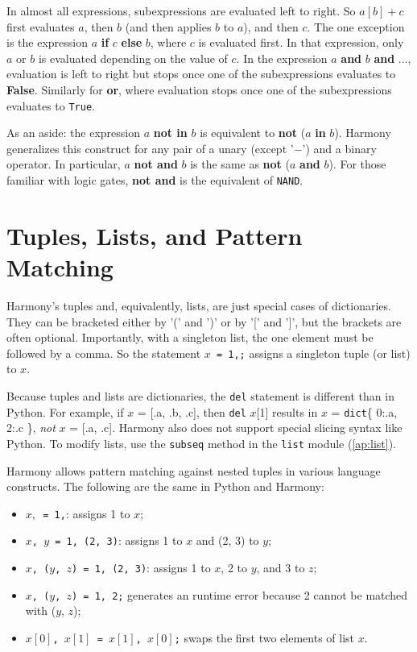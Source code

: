 \documentclass{report}
\begin{document}
In almost all expressions, subexpressions are evaluated left to right.  So $a[b] + c$
first evaluates $a$, then $b$ (and then applies $b$ to $a$), and then $c$.  The one
exception is the expression $a$ \textbf{if} $c$ \textbf{else} $b$, where $c$ is evaluated
first.  In that expression, only $a$ or $b$ is evaluated depending on the value of $c$.
In the expression $a$ \textbf{and} $b$ \textbf{and} $...$, evaluation is left
to right but stops once one of the subexpressions evaluates to \textbf{False}.
Similarly for \textbf{or}, where evaluation stops once one of the subexpressions
evaluates to \texttt{True}.

As an aside:
the expression $a$ \textbf{not in} $b$ is equivalent to \textbf{not} ($a$ \textbf{in} $b$).
Harmony generalizes this construct for any pair of a unary (except '$-$') and a binary operator.
In particular, $a$ \textbf{not and} $b$ is the same as \textbf{not} ($a$ \textbf{and} $b$).  
For those familiar with logic gates, \textbf{not and} is the equivalent of \texttt{NAND}.

\section{Tuples, Lists, and Pattern Matching}

Harmony's tuples and, equivalently, lists, are just special cases of dictionaries.
They can be bracketed either by '(' and ')' or by '[' and ']', but
the brackets are often optional.  Importantly, with a singleton list, the
one element must be followed by a comma.
So the statement \texttt{$x$ = 1,;} assigns a singleton tuple (or list) to $x$.

Because tuples and lists are dictionaries, the \texttt{del} statement is
different than in Python.  For example, if $x$ = [.a, .b, .c], then
\texttt{del} $x$[1] results in $x$ = \texttt{dict}\{ 0:.a, 2:.c \}, \emph{not}
$x$ = [.a, .c].
Harmony also does not support special slicing syntax like Python.
To modify lists, use the \texttt{subseq} method in the \texttt{list} module
(\autoref{ap:list}).

Harmony allows pattern matching against nested tuples in various
language constructs.
%
The following are the same in Python and Harmony:
\begin{itemize}
\item \texttt{$x,$ = 1,}: assigns 1 to $x$;
\item \texttt{$x$, $y$ = 1, (2, 3)}: assigns 1 to $x$ and (2, 3) to $y$;
\item \texttt{$x$, ($y$, $z$) = 1, (2, 3)}: assigns 1 to $x$, 2 to $y$, and
3 to $z$;
\item \texttt{$x$, ($y$, $z$) = 1, 2;} generates an runtime error because 2 cannot
be matched with ($y$, $z$);
\item \texttt{$x[0]$, $x[1]$ = $x[1]$, $x[0]$;} swaps the first two elements of list $x$.
\end{itemize}
\end{document}
